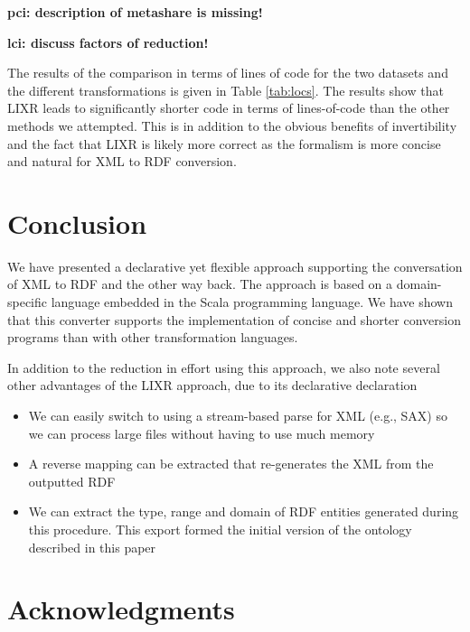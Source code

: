 \documentclass{acm_proc_article-sp}
\begin{document}
\textbf{pci: description of metashare is missing!}

\textbf{lci: discuss factors of reduction!}

The results of the comparison in terms of lines of code for the two datasets and the different transformations is given in Table \ref{tab:locs}.
The results show that 
LIXR leads to significantly shorter code in terms of lines-of-code than the other methods
we attempted. This is in addition to the obvious benefits of invertibility and
the fact that LIXR is likely more correct as the formalism is more concise and 
natural for XML to RDF conversion. 

\section{Conclusion}
\label{sec:conclusion}

We have presented a declarative yet flexible approach supporting the conversation of XML to RDF and the other way back. The approach
is based on a domain-specific language embedded in the Scala programming language. We have shown that this converter supports the implementation of concise and shorter conversion programs than with other transformation languages.

In addition to the reduction in effort using this approach, we also note several
other advantages of the LIXR approach, due to its declarative declaration
\begin{itemize}
\item We can easily switch to using a stream-based parse for XML (e.g., SAX)
so we can process large files without having to use much memory
\item A reverse mapping can be extracted that re-generates the XML from the
outputted RDF
\item We can extract the type, range and domain of RDF entities generated
during this procedure. This export formed the initial version of the
ontology described in this paper
\end{itemize}


\section*{Acknowledgments}



\end{document}
